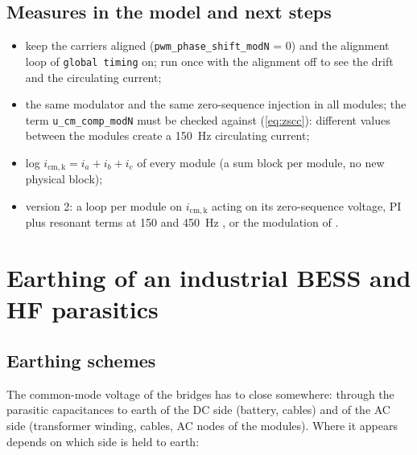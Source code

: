 \documentclass[11pt,a4paper]{scrartcl}
\newcommand{\ped}[1]{_{\mathrm{#1}}}
\newcommand{\code}[1]{\texttt{#1}}
\begin{document}
\begin{onehalfspace}
\subsection{Measures in the model and next steps}

\begin{itemize}[nosep]
	\item keep the carriers aligned (\code{pwm\_phase\_shift\_modN} = 0) and the alignment loop of \code{global timing} on; run once with the alignment off to see the drift and the circulating current;
	\item the same modulator and the same zero-sequence injection in all modules; the term \code{u\_cm\_comp\_modN} must be checked against (\ref{eq:zscc}): different values between the modules create a \SI{150}{Hz} circulating current;
	\item log $i\ped{cm,k} = i_a + i_b + i_c$ of every module (a sum block per module, no new physical block);
	\item version 2: a loop per module on $i\ped{cm,k}$ acting on its zero-sequence voltage, PI plus resonant terms at 150 and \SI{450}{Hz} \cite{kiel_zscc}, or the modulation of \cite{zhu2017}.
\end{itemize}

\section{Earthing of an industrial BESS and HF parasitics}
\label{sec:earthing}

\subsection{Earthing schemes}

The common-mode voltage of the bridges has to close somewhere: through the parasitic capacitances to earth of the DC side (battery, cables) and of the AC side (transformer winding, cables, AC nodes of the modules). Where it appears depends on which side is held to earth:


\end{onehalfspace}
\end{document}
